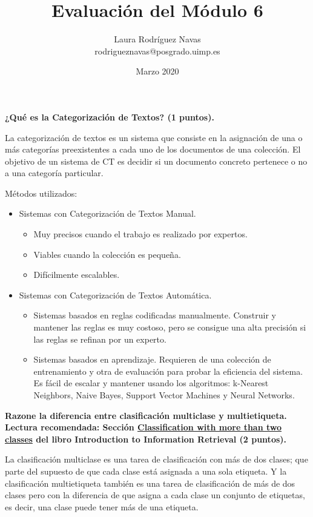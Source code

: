 \documentclass[11pt]{exam}
\title{Evaluación del Módulo 6}
\author{Laura Rodríguez Navas \\ rodrigueznavas@posgrado.uimp.es}
\date{Marzo 2020}
\begin{document}
	
\maketitle

\begin{questions}
	
{\bf \question ¿Qué es la Categorización de Textos? (1 puntos).}

La categorización de textos es un sistema que consiste en la asignación de una o más categorías preexistentes a cada uno de los documentos de una colección. El objetivo de un sistema de CT es decidir si un documento concreto pertenece o no a una categoría particular.

Métodos utilizados:

\begin{itemize}
	\item Sistemas con Categorización de Textos Manual.
	\begin{itemize}
		\item Muy precisos cuando el trabajo es realizado por expertos.
		\item Viables cuando la colección es pequeña.
		\item Difícilmente escalables.
	\end{itemize}
	\item Sistemas con Categorización de Textos Automática.
	\begin{itemize}
		\item Sistemas basados en reglas codificadas manualmente.
		Construir y mantener las reglas es muy costoso, pero se consigue una alta precisión si las reglas se refinan por un experto.
		\item Sistemas basados en aprendizaje.
		Requieren de una colección de entrenamiento y otra de evaluación para probar la eficiencia del sistema.
		Es fácil de escalar y mantener usando los algoritmos: k-Nearest Neighbors, Naive Bayes, Support Vector Machines y Neural Networks.
	\end{itemize}
\end{itemize}

{\bf \question Razone la diferencia entre clasificación multiclase y multietiqueta. Lectura recomendada: Sección \href{https://nlp.stanford.edu/IR-book/html/htmledition/classification-with-more-than-two-classes-1.html}{Classification with more than two classes} del libro Introduction to Information Retrieval (2 puntos).}

La clasificación multiclase es una tarea de clasificación con más de dos clases; que parte del supuesto de que cada clase está asignada a una sola etiqueta. Y la clasificación multietiqueta también es una tarea de clasificación de más de dos clases pero con la diferencia de que asigna a cada clase un conjunto de etiquetas, es decir, una clase puede tener más de una etiqueta.


\end{questions}
\end{document}
